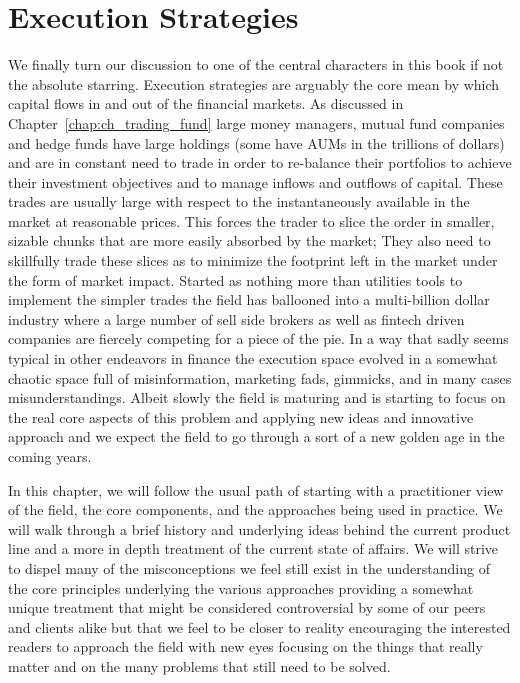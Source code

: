 \chapter{Execution Strategies\label{chap:ch_exec_models}}

We finally turn our discussion to one of the central characters in this book if not the absolute starring. Execution strategies are arguably the core mean by which capital flows in and out of the financial markets.  As discussed in Chapter~\ref{chap:ch_trading_fund} large money managers, mutual fund companies and hedge funds have large holdings (some have AUMs in the trillions of dollars) and are in constant need to trade in order to re-balance their portfolios to achieve their investment objectives and to manage inflows and  outflows of capital. These trades are usually large with respect to the instantaneously available  in the market at reasonable prices. This forces the trader to slice the order in smaller, sizable chunks that are more easily absorbed by the market; They also need to skillfully trade these slices as to minimize the footprint left in the market under the form of market impact. Started as nothing more than utilities tools to implement the simpler trades the field has ballooned into a multi-billion dollar industry where a large number of sell side brokers as well as fintech driven companies are fiercely competing for a piece of the pie. In a way that sadly seems typical in other endeavors in finance the execution space evolved in a somewhat chaotic space full of misinformation, marketing fads, gimmicks, and in many cases misunderstandings. Albeit slowly the field is maturing and is starting to focus on the real core aspects of this problem and applying new ideas and innovative approach and we expect the field to go through a sort of a new golden age in the coming years.


In this chapter, we will follow the usual path of starting with a practitioner view of the field, the core components, and the approaches being used in practice. We will walk through a brief history and underlying ideas behind the current product line and a more in depth treatment of the current state of affairs. We will strive to dispel many of the misconceptions we feel still exist in the understanding of the core principles underlying the various approaches providing a somewhat unique treatment that might be considered controversial by some of our peers and clients alike but that we feel to be closer to reality encouraging the interested readers to approach the field with new eyes focusing on the things that really matter and on the many problems that still need to be solved.

